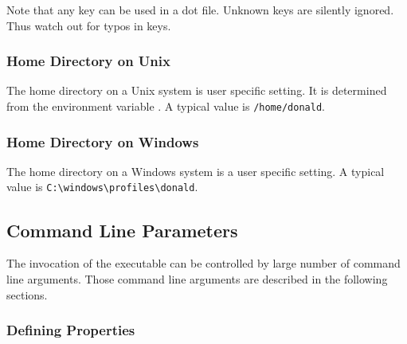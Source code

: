 Note that any key can be used in a dot file. Unknown keys are silently
ignored. Thus watch out for typos in keys.


\subsubsection{Home Directory on Unix}

The home directory on a Unix system is user specific
setting. It is determined from the environment variable . A
typical value is \texttt{/home/donald}.

\subsubsection{Home Directory on Windows}

The home directory on a Windows system is a user
specific setting.  A typical value is
\verb|C:\windows\profiles\donald|.



\subsection{Command Line Parameters}

The invocation of the executable  can be controlled by
large number of command line arguments. Those command line arguments
are described in the following sections.

\subsubsection{Defining Properties}

